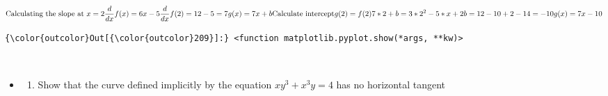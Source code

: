 \documentclass[11pt]{article}
\providecommand{\tightlist}{%
      \setlength{\itemsep}{0pt}\setlength{\parskip}{0pt}}
\begin{document}
    
\begin{equation}
\text{Calculating the slope at }x=2\\
\frac{d}{dx}f(x)=6x-5\\
\frac{d}{dx}f(2)=12-5=7\\
g(x)=7x+b\\
\text{Calculate intercept}\\
g(2)=f(2)\\
7*2+b=3*2^2-5*x+2\\
b=12-10+2-14=-10\\
g(x)=7x-10
\end{equation}


    
\begin{Verbatim}[commandchars=\\\{\}]
{\color{outcolor}Out[{\color{outcolor}209}]:} <function matplotlib.pyplot.show(*args, **kw)>
\end{Verbatim}
            
    \begin{center}
    \end{center}
    { \hspace*{\fill} \\}
    
    \begin{itemize}
\item
  \begin{enumerate}
  \def\labelenumi{(\alph{enumi})}
  \setcounter{enumi}{1}
  \tightlist
  \item
    Show that the curve defined implicitly by the equation
    \(xy^3+x^3y=4\) has no horizontal tangent
  \end{enumerate}
\end{itemize}
\end{document}
